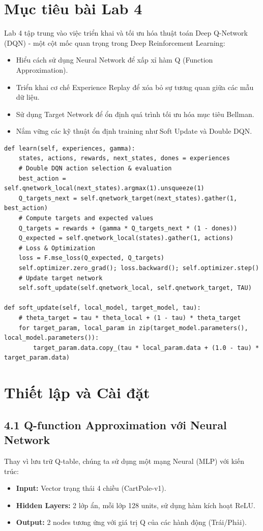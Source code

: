 \section{Mục tiêu bài Lab 4}
Lab 4 tập trung vào việc triển khai và tối ưu hóa thuật toán Deep Q-Network (DQN) - một cột mốc quan trọng trong Deep Reinforcement Learning:
\begin{itemize}
    \item Hiểu cách sử dụng Neural Network để xấp xỉ hàm Q (Function Approximation).
    \item Triển khai cơ chế Experience Replay để xóa bỏ sự tương quan giữa các mẫu dữ liệu.
    \item Sử dụng Target Network để ổn định quá trình tối ưu hóa mục tiêu Bellman.
    \item Nắm vững các kỹ thuật ổn định training như Soft Update và Double DQN.
\end{itemize}

\begin{lstlisting}[style=PythonStyle, caption={Soft Update \& DQN Learn}]
def learn(self, experiences, gamma):
    states, actions, rewards, next_states, dones = experiences
    # Double DQN action selection & evaluation
    best_action = self.qnetwork_local(next_states).argmax(1).unsqueeze(1)
    Q_targets_next = self.qnetwork_target(next_states).gather(1, best_action)
    # Compute targets and expected values
    Q_targets = rewards + (gamma * Q_targets_next * (1 - dones))
    Q_expected = self.qnetwork_local(states).gather(1, actions)
    # Loss & Optimization
    loss = F.mse_loss(Q_expected, Q_targets)
    self.optimizer.zero_grad(); loss.backward(); self.optimizer.step()
    # Update target network
    self.soft_update(self.qnetwork_local, self.qnetwork_target, TAU)

def soft_update(self, local_model, target_model, tau):
    # theta_target = tau * theta_local + (1 - tau) * theta_target
    for target_param, local_param in zip(target_model.parameters(), local_model.parameters()):
        target_param.data.copy_(tau * local_param.data + (1.0 - tau) * target_param.data)
\end{lstlisting}
\section{Thiết lập và Cài đặt}

\subsection{4.1 Q-function Approximation với Neural Network}
Thay vì lưu trữ Q-table, chúng ta sử dụng một mạng Neural (MLP) với kiến trúc:
\begin{itemize}
    \item \textbf{Input:} Vector trạng thái 4 chiều (CartPole-v1).
    \item \textbf{Hidden Layers:} 2 lớp ẩn, mỗi lớp 128 units, sử dụng hàm kích hoạt ReLU.
    \item \textbf{Output:} 2 nodes tương ứng với giá trị Q của các hành động (Trái/Phải).
\end{itemize}

